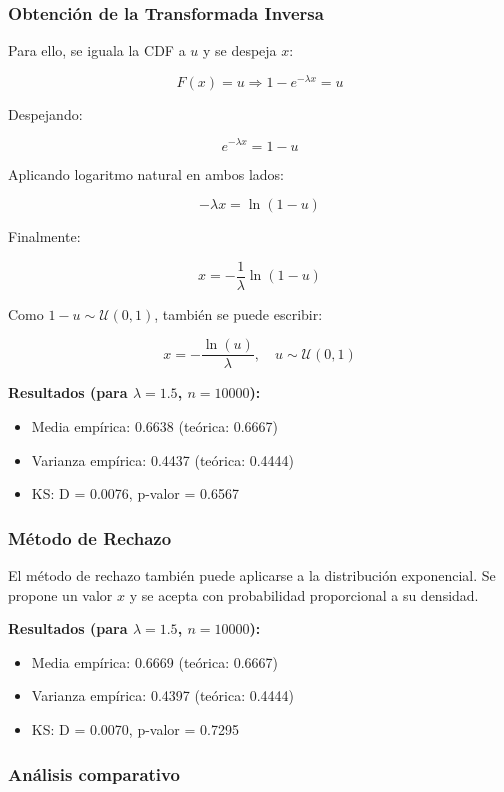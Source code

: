\documentclass{article}
\begin{document}
\subsubsection*{Obtención de la Transformada Inversa}

Para ello, se iguala la CDF a $u$ y se despeja $x$:

\[
F(x) = u \Rightarrow 1 - e^{-\lambda x} = u
\]

Despejando:

\[
e^{-\lambda x} = 1 - u
\]

Aplicando logaritmo natural en ambos lados:

\[
-\lambda x = \ln(1 - u)
\]

Finalmente:

\[
x = -\frac{1}{\lambda} \ln(1 - u)
\]

Como $1 - u \sim \mathcal{U}(0,1)$, también se puede escribir:

\[
x = -\frac{\ln(u)}{\lambda}, \quad u \sim \mathcal{U}(0,1)
\]


\textbf{Resultados (para $\lambda=1.5$, $n=10000$):}

\begin{itemize}
  \item Media empírica: 0.6638 (teórica: 0.6667)
  \item Varianza empírica: 0.4437 (teórica: 0.4444)
  \item KS: D = 0.0076, p-valor = 0.6567
\end{itemize}

\subsubsection{Método de Rechazo}

El método de rechazo también puede aplicarse a la distribución exponencial. Se propone un valor $x$ y se acepta con probabilidad proporcional a su densidad.

\textbf{Resultados (para $\lambda=1.5$, $n=10000$):}

\begin{itemize}
  \item Media empírica: 0.6669 (teórica: 0.6667)
  \item Varianza empírica: 0.4397 (teórica: 0.4444)
  \item KS: D = 0.0070, p-valor = 0.7295
\end{itemize}

\subsubsection{Análisis comparativo}
\end{document}
